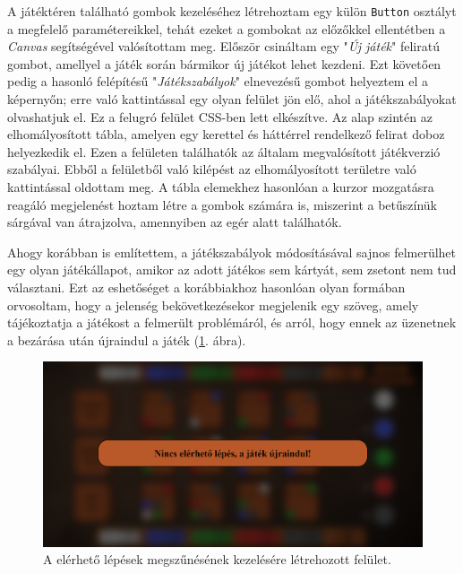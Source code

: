 
A játéktéren található gombok kezeléséhez létrehoztam egy külön \texttt{Button} osztályt a megfelelő paramétereikkel, tehát ezeket a gombokat az előzőkkel ellentétben a \textit{Canvas} segítségével valósítottam meg. Először csináltam egy "\textit{Új játék}" feliratú gombot, amellyel a játék során bármikor új játékot lehet kezdeni. Ezt követően pedig a hasonló felépítésű "\textit{Játékszabályok}" elnevezésű gombot helyeztem el a képernyőn; erre való kattintással egy olyan felület jön elő, ahol a játékszabályokat olvashatjuk el. Ez a felugró felület CSS-ben lett elkészítve. Az alap szintén az elhomályosított tábla, amelyen egy kerettel és háttérrel rendelkező felirat doboz helyezkedik el. Ezen a felületen találhatók az általam megvalósított játékverzió szabályai. Ebből a felületből való kilépést az elhomályosított területre való kattintással oldottam meg. A tábla elemekhez hasonlóan a kurzor mozgatásra reagáló megjelenést hoztam létre a gombok számára is, miszerint a betűszínük sárgával van átrajzolva, amennyiben az egér alatt találhatók.



Ahogy korábban is említettem, a játékszabályok módosításával sajnos felmerülhet egy olyan játékállapot, amikor az adott játékos sem kártyát, sem zsetont nem tud választani. Ezt az eshetőséget a korábbiakhoz hasonlóan olyan formában orvosoltam, hogy a jelenség bekövetkezésekor megjelenik egy szöveg, amely tájékoztatja a játékost a felmerült problémáról, és arról, hogy ennek az üzenetnek a bezárása után újraindul a játék (\ref{fig:impossible_action}. ábra).

\begin{figure}[H]
\centering
\includegraphics[width=\textwidth]{images/impossible_action.png}
\caption{A elérhető lépések megszűnésének kezelésére létrehozott felület.}
\label{fig:impossible_action}
\end{figure}


